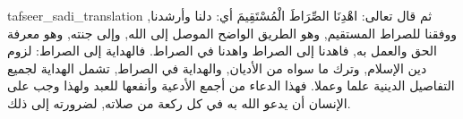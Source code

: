 \begin{taggedblock}{tafseer_sadi_translation}
ثم قال تعالى:
{ اهْدِنَا الصِّرَاطَ الْمُسْتَقِيمَ }
أي: دلنا وأرشدنا, ووفقنا للصراط المستقيم, وهو الطريق الواضح الموصل إلى الله, وإلى جنته, وهو معرفة الحق والعمل به, فاهدنا إلى الصراط واهدنا في الصراط. فالهداية إلى الصراط: لزوم دين الإسلام, وترك ما سواه من الأديان, والهداية في الصراط, تشمل الهداية لجميع التفاصيل الدينية علما وعملا. فهذا الدعاء من أجمع الأدعية وأنفعها للعبد ولهذا وجب على الإنسان أن يدعو الله به في كل ركعة من صلاته, لضرورته إلى ذلك.
\end{taggedblock}

\begin{comment}
Please use the following for footnotes:- Sample\footnoteQ{Text of Qur'an footnote goes here.}.
Sample\footnoteT{Text of Tafseer footnote goes here.}.
\end{comment}